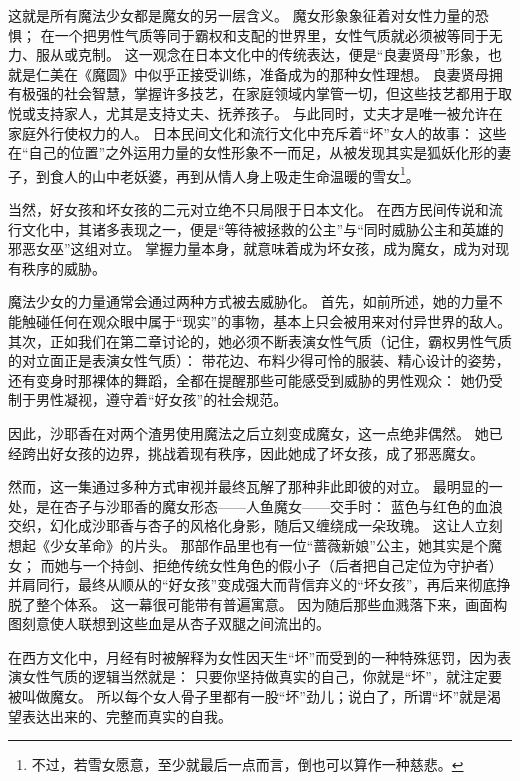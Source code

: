 这就是所有魔法少女都是魔女的另一层含义。
魔女形象象征着对女性力量的恐惧；
在一个把男性气质等同于霸权和支配的世界里，女性气质就必须被等同于无力、服从或克制\cite{gilbert1979snow-white}。
这一观念在日本文化中的传统表达，便是“良妻贤母”形象，也就是仁美在《魔圆》中似乎正接受训练，准备成为的那种女性理想。
良妻贤母拥有极强的社会智慧，掌握许多技艺，在家庭领域内掌管一切，但这些技艺都用于取悦或支持家人，尤其是支持丈夫、抚养孩子。
与此同时，丈夫才是唯一被允许在家庭外行使权力的人\cite{fujimura-fanselow1991good-wives}。
日本民间文化和流行文化中充斥着“坏”女人的故事：
这些在“自己的位置”之外运用力量的女性形象不一而足，从被发现其实是狐妖化形的妻子\cite{smyers1999inari-jewel}，到食人的山中老妖婆\cite{reider2010yamauba}，再到从情人身上吸走生命温暖的雪女\footnote{%
    不过，若雪女愿意，至少就最后一点而言，倒也可以算作一种慈悲。
}\cite{hearn1998yuki-onna}。

当然，好女孩和坏女孩的二元对立绝不只局限于日本文化。
在西方民间传说和流行文化中，其诸多表现之一，便是“等待被拯救的公主”与“同时威胁公主和英雄的邪恶女巫”这组对立。
掌握力量本身，就意味着成为坏女孩，成为魔女，成为对现有秩序的威胁\cite{gilbert1979snow-white}。


魔法少女的力量通常会通过两种方式被去威胁化。
首先，如前所述，她的力量不能触碰任何在观众眼中属于“现实”的事物，基本上只会被用来对付异世界的敌人。
其次，正如我们在第二章讨论的，她必须不断表演女性气质（记住，霸权男性气质的对立面正是表演女性气质）：
带花边、布料少得可怜的服装、精心设计的姿势，还有变身时那裸体的舞蹈，全都在提醒那些可能感受到威胁的男性观众：
她仍受制于男性凝视，遵守着“好女孩”的社会规范。

因此，沙耶香在对两个渣男使用魔法之后立刻变成魔女，这一点绝非偶然。
她已经跨出好女孩的边界，挑战着现有秩序，因此她成了坏女孩，成了邪恶魔女。

然而，这一集通过多种方式审视并最终瓦解了那种非此即彼的对立。
最明显的一处，是在杏子与沙耶香的魔女形态——人鱼魔女——交手时：
蓝色与红色的血浪交织，幻化成沙耶香与杏子的风格化身影，随后又缠绕成一朵玫瑰。
这让人立刻想起《少女革命》的片头\cite{utena-student-council-saga-2011}。
那部作品里也有一位“蔷薇新娘”公主，她其实是个魔女；
而她与一个持剑、拒绝传统女性角色的假小子（后者把自己定位为守护者）并肩同行，最终从顺从的“好女孩”变成强大而背信弃义的“坏女孩”，再后来彻底挣脱了整个体系\cite{utena-apocalypse-saga-2011}。
这一幕很可能带有普遍寓意。
因为随后那些血溅落下来，画面构图刻意使人联想到这些血是从杏子双腿之间流出的。

在西方文化中，月经有时被解释为女性因天生“坏”而受到的一种特殊惩罚\cite{delaney1988curse}，因为表演女性气质的逻辑当然就是：
只要你坚持做真实的自己，你就是“坏”，就注定要被叫做魔女。
所以每个女人骨子里都有一股“坏”劲儿；说白了，所谓“坏”就是渴望表达出来的、完整而真实的自我。

